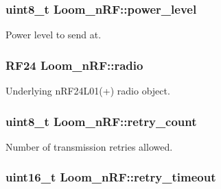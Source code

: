 \subsubsection[{\texorpdfstring{power\+\_\+level}{power_level}}]{\setlength{\rightskip}{0pt plus 5cm}uint8\+\_\+t Loom\+\_\+n\+R\+F\+::power\+\_\+level\hspace{0.3cm}{\ttfamily [protected]}}\hypertarget{class_loom__n_r_f_a47eb5605398f1d83febef1c0ec3ef27b}{}\label{class_loom__n_r_f_a47eb5605398f1d83febef1c0ec3ef27b}


Power level to send at. 

\subsubsection[{\texorpdfstring{radio}{radio}}]{\setlength{\rightskip}{0pt plus 5cm}R\+F24 Loom\+\_\+n\+R\+F\+::radio\hspace{0.3cm}{\ttfamily [protected]}}\hypertarget{class_loom__n_r_f_a785fc4d36d622edea8a8a1e35de80e88}{}\label{class_loom__n_r_f_a785fc4d36d622edea8a8a1e35de80e88}


Underlying n\+R\+F24\+L01(+) radio object. 

\subsubsection[{\texorpdfstring{retry\+\_\+count}{retry_count}}]{\setlength{\rightskip}{0pt plus 5cm}uint8\+\_\+t Loom\+\_\+n\+R\+F\+::retry\+\_\+count\hspace{0.3cm}{\ttfamily [protected]}}\hypertarget{class_loom__n_r_f_a53c54395b6ac8e89b8c3a0b3d582a9fe}{}\label{class_loom__n_r_f_a53c54395b6ac8e89b8c3a0b3d582a9fe}


Number of transmission retries allowed. 

\subsubsection[{\texorpdfstring{retry\+\_\+timeout}{retry_timeout}}]{\setlength{\rightskip}{0pt plus 5cm}uint16\+\_\+t Loom\+\_\+n\+R\+F\+::retry\+\_\+timeout\hspace{0.3cm}{\ttfamily [protected]}}\hypertarget{class_loom__n_r_f_a57f2765c35a200cf53ad055f5e1bef13}{}\label{class_loom__n_r_f_a57f2765c35a200cf53ad055f5e1bef13}


